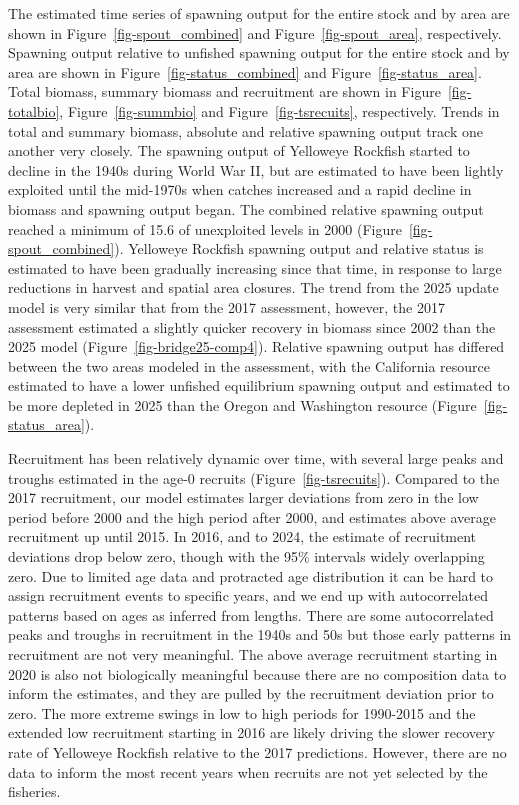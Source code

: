 \documentclass[
]{scrartcl}
\begin{document}
The estimated time series of spawning output for the entire stock and by
area are shown in Figure~\ref{fig-spout_combined} and
Figure~\ref{fig-spout_area}, respectively. Spawning output relative to
unfished spawning output for the entire stock and by area are shown in
Figure~\ref{fig-status_combined} and Figure~\ref{fig-status_area}. Total
biomass, summary biomass and recruitment are shown in
Figure~\ref{fig-totalbio}, Figure~\ref{fig-summbio} and
Figure~\ref{fig-tsrecuits}, respectively. Trends in total and summary
biomass, absolute and relative spawning output track one another very
closely. The spawning output of Yelloweye Rockfish started to decline in
the 1940s during World War II, but are estimated to have been lightly
exploited until the mid-1970s when catches increased and a rapid decline
in biomass and spawning output began. The combined relative spawning
output reached a minimum of 15.6 of unexploited levels in 2000
(Figure~\ref{fig-spout_combined}). Yelloweye Rockfish spawning output
and relative status is estimated to have been gradually increasing since
that time, in response to large reductions in harvest and spatial area
closures. The trend from the 2025 update model is very similar that from
the 2017 assessment, however, the 2017 assessment estimated a slightly
quicker recovery in biomass since 2002 than the 2025 model
(Figure~\ref{fig-bridge25-comp4}). Relative spawning output has differed
between the two areas modeled in the assessment, with the California
resource estimated to have a lower unfished equilibrium spawning output
and estimated to be more depleted in 2025 than the Oregon and Washington
resource (Figure~\ref{fig-status_area}).

Recruitment has been relatively dynamic over time, with several large
peaks and troughs estimated in the age-0 recruits
(Figure~\ref{fig-tsrecuits}). Compared to the 2017 recruitment, our
model estimates larger deviations from zero in the low period before
2000 and the high period after 2000, and estimates above average
recruitment up until 2015. In 2016, and to 2024, the estimate of
recruitment deviations drop below zero, though with the 95\% intervals
widely overlapping zero. Due to limited age data and protracted age
distribution it can be hard to assign recruitment events to specific
years, and we end up with autocorrelated patterns based on ages as
inferred from lengths. There are some autocorrelated peaks and troughs
in recruitment in the 1940s and 50s but those early patterns in
recruitment are not very meaningful. The above average recruitment
starting in 2020 is also not biologically meaningful because there are
no composition data to inform the estimates, and they are pulled by the
recruitment deviation prior to zero. The more extreme swings in low to
high periods for 1990-2015 and the extended low recruitment starting in
2016 are likely driving the slower recovery rate of Yelloweye Rockfish
relative to the 2017 predictions. However, there are no data to inform
the most recent years when recruits are not yet selected by the
fisheries.
\end{document}
